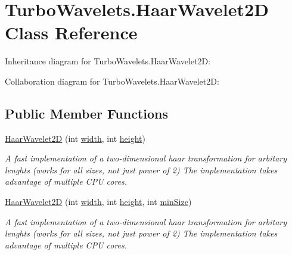 \hypertarget{class_turbo_wavelets_1_1_haar_wavelet2_d}{\section{Turbo\+Wavelets.\+Haar\+Wavelet2\+D Class Reference}
\label{class_turbo_wavelets_1_1_haar_wavelet2_d}
}


Inheritance diagram for Turbo\+Wavelets.\+Haar\+Wavelet2\+D\+:


Collaboration diagram for Turbo\+Wavelets.\+Haar\+Wavelet2\+D\+:
\subsection*{Public Member Functions}
\begin{DoxyCompactItemize}
\item 
\hyperlink{class_turbo_wavelets_1_1_haar_wavelet2_d_ab55a20658fe1f22b6e756418b4e1dc29}{Haar\+Wavelet2\+D} (int \hyperlink{class_turbo_wavelets_1_1_wavelet2_d_aaa4b3711957fe1798980e6891331a08d}{width}, int \hyperlink{class_turbo_wavelets_1_1_wavelet2_d_afb2aa87b89b82f329357cbdc0cde18a8}{height})
\begin{DoxyCompactList}\small\item\em A fast implementation of a two-\/dimensional haar transformation for arbitary lenghts (works for all sizes, not just power of 2) The implementation takes advantage of multiple C\+P\+U cores. \end{DoxyCompactList}\item 
\hyperlink{class_turbo_wavelets_1_1_haar_wavelet2_d_a8064166eec2c0a4b66378896b882bd47}{Haar\+Wavelet2\+D} (int \hyperlink{class_turbo_wavelets_1_1_wavelet2_d_aaa4b3711957fe1798980e6891331a08d}{width}, int \hyperlink{class_turbo_wavelets_1_1_wavelet2_d_afb2aa87b89b82f329357cbdc0cde18a8}{height}, int \hyperlink{class_turbo_wavelets_1_1_wavelet2_d_af5148ef1a46dd5694ccea13aa8f1b9e2}{min\+Size})
\begin{DoxyCompactList}\small\item\em A fast implementation of a two-\/dimensional haar transformation for arbitary lenghts (works for all sizes, not just power of 2) The implementation takes advantage of multiple C\+P\+U cores. \end{DoxyCompactList}\end{DoxyCompactItemize}
